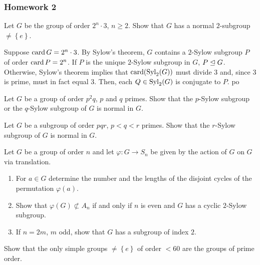 \subsubsection{Homework 2}
\setcounter{exercise}{0}
\setcounter{equation}{0}

\begin{problem}
  Let \(G\) be the group of order \(2^n\cdot 3\), \(n\geq 2\). Show that
  \(G\) has a normal \(2\)-subgroup \(\neq\left\{e\right\}\).
\end{problem}
\begin{solution}
  Suppose \(\operatorname{card} G=2^n\cdot 3\). By Sylow's theorem, \(G\) contains a
  \(2\)-Sylow subgroup \(P\) of order \(\operatorname{card} P=2^n\). If \(P\) is the
  unique \(2\)-Sylow subgroup in \(G\), \(P\trianglelefteq G\). Otherwise, Sylow's
  theorem implies that \(\operatorname{card}({\operatorname{Syl}_2(G)})\) must divide \(3\) and, since
  \(3\) is prime, must in fact equal \(3\). Then, each \(Q\in\operatorname{Syl}_2(G)\) is
  conjugate to \(P\). po
\end{solution}

\begin{problem}
  Let \(G\) be a group of order \(p^2q\), \(p\) and \(q\) primes. Show that
  the \(p\)-Sylow subgroup or the \(q\)-Sylow subgroup of \(G\) is normal
  in \(G\).
\end{problem}
\begin{solution}
\end{solution}

\begin{problem}
  Let \(G\) be a subgroup of order \(pqr\), \(p<q<r\) primes. Show that the
  \(r\)-Sylow subgroup of \(G\) is normal in \(G\).
\end{problem}
\begin{solution}
\end{solution}

\begin{problem}
  Let \(G\) be a group of order \(n\) and let \(\varphi\colon G\to S_n\) be
  given by the action of \(G\) on \(G\) via translation.
  \begin{enumerate}[label=(\alph*),noitemsep]
  \item For \(a\in G\) determine the number and the lengths of the disjoint
    cycles of the permutation \(\varphi(a)\).
  \item Show that \(\varphi(G)\nsubset A_n\) if and only if \(n\) is even
    and \(G\) has a cyclic \(2\)-Sylow subgroup.
  \item If \(n=2m\), \(m\) odd, show that \(G\) has a subgroup of index
    \(2\).
  \end{enumerate}
\end{problem}
\begin{solution}
\end{solution}

\begin{problem}
  Show that the only simple groups \(\neq\left\{e\right\}\) of order
  \(<60\) are the groups of prime order.
\end{problem}
\begin{solution}
\end{solution}

